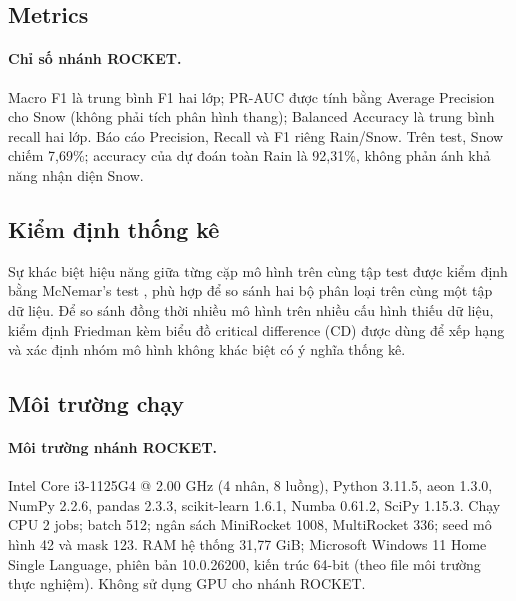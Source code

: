 \subsection{Metrics}
\label{sec:metrics}


\paragraph{Chỉ số nhánh ROCKET.} Macro F1 là trung bình F1 hai lớp; PR-AUC được tính bằng Average Precision cho Snow (không phải tích phân hình thang); Balanced Accuracy là trung bình recall hai lớp. Báo cáo Precision, Recall và F1 riêng Rain/Snow. Trên test, Snow chiếm 7,69\%; accuracy của dự đoán toàn Rain là 92,31\%, không phản ánh khả năng nhận diện Snow.

\subsection{Kiểm định thống kê}
\label{sec:kiem-dinh-thong-ke}

Sự khác biệt hiệu năng giữa từng cặp mô hình trên cùng tập test được kiểm định bằng
McNemar's test \cite{mcnemar1947}, phù hợp để so sánh hai bộ phân loại trên cùng một tập
dữ liệu. Để so sánh đồng thời nhiều mô hình trên nhiều cấu hình thiếu dữ liệu, kiểm định
Friedman kèm biểu đồ critical difference (CD) \cite{demsar2006statistical} được dùng để
xếp hạng và xác định nhóm mô hình không khác biệt có ý nghĩa thống kê.

\subsection{Môi trường chạy}
\label{sec:moi-truong-chay}


\paragraph{Môi trường nhánh ROCKET.} Intel Core i3-1125G4 @ 2.00 GHz (4 nhân, 8 luồng), Python 3.11.5, aeon 1.3.0, NumPy 2.2.6, pandas 2.3.3, scikit-learn 1.6.1, Numba 0.61.2, SciPy 1.15.3. Chạy CPU 2 jobs; batch 512; ngân sách MiniRocket 1008, MultiRocket 336; seed mô hình 42 và mask 123. RAM hệ thống 31,77 GiB; Microsoft Windows 11 Home Single Language, phiên bản 10.0.26200, kiến trúc 64-bit (theo file môi trường thực nghiệm). Không sử dụng GPU cho nhánh ROCKET.
